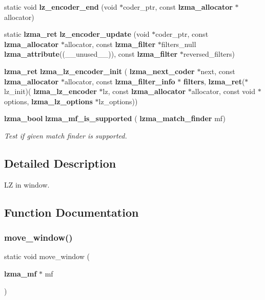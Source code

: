 \begin{DoxyCompactItemize}
static void {\bfseries lz\+\_\+encoder\+\_\+end} (void $\ast$coder\+\_\+ptr, const \textbf{ lzma\+\_\+allocator} $\ast$allocator)
\item 
\mbox{\label{lz__encoder_8c_a55de0453b1b1f8f94eb0a33facb93c56}} 
static \textbf{ lzma\+\_\+ret} {\bfseries lz\+\_\+encoder\+\_\+update} (void $\ast$coder\+\_\+ptr, const \textbf{ lzma\+\_\+allocator} $\ast$allocator, const \textbf{ lzma\+\_\+filter} $\ast$filters\+\_\+null \textbf{ lzma\+\_\+attribute}((\+\_\+\+\_\+unused\+\_\+\+\_\+)), const \textbf{ lzma\+\_\+filter} $\ast$reversed\+\_\+filters)
\item 
\mbox{\label{lz__encoder_8c_adc2df5d5f56b80e7a7431e172b44c972}} 
\textbf{ lzma\+\_\+ret} {\bfseries lzma\+\_\+lz\+\_\+encoder\+\_\+init} (\textbf{ lzma\+\_\+next\+\_\+coder} $\ast$next, const \textbf{ lzma\+\_\+allocator} $\ast$allocator, const \textbf{ lzma\+\_\+filter\+\_\+info} $\ast$\textbf{ filters}, \textbf{ lzma\+\_\+ret}($\ast$lz\+\_\+init)(\textbf{ lzma\+\_\+lz\+\_\+encoder} $\ast$lz, const \textbf{ lzma\+\_\+allocator} $\ast$allocator, const void $\ast$options, \textbf{ lzma\+\_\+lz\+\_\+options} $\ast$lz\+\_\+options))
\item 
\textbf{ lzma\+\_\+bool} \textbf{ lzma\+\_\+mf\+\_\+is\+\_\+supported} (\textbf{ lzma\+\_\+match\+\_\+finder} mf)
\begin{DoxyCompactList}\small\item\em Test if given match finder is supported. \end{DoxyCompactList}\end{DoxyCompactItemize}


\subsection{Detailed Description}
LZ in window. 



\subsection{Function Documentation}
\mbox{\label{lz__encoder_8c_a0ffebd3acf94a8ae2aecd13872bf9ce6}} 
\subsubsection{move\+\_\+window()}
{\footnotesize\ttfamily static void move\+\_\+window (\begin{DoxyParamCaption}\item[{\textbf{ lzma\+\_\+mf} $\ast$}]{mf }\end{DoxyParamCaption})\hspace{0.3cm}{\ttfamily [static]}}



